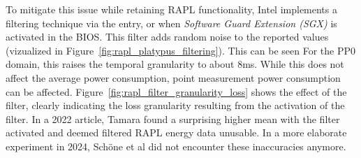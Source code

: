 \begin{itemize}
    To mitigate this issue while retaining RAPL functionality, Intel implements a filtering technique via the \parencite[Table 2-2]{intel2023} entry, or when \textit{Software Guard Extension (SGX)} is activated in the BIOS. This filter adds random noise to the reported values (vizualized in Figure~\ref{fig:rapl_platypus_filtering}). This can be seen For the PP0 domain, this raises the temporal granularity to about 8ms. While this does not affect the average power consumption, point measurement power consumption can be affected. Figure~\ref{fig:rapl_filter_granularity_loss} shows the effect of the filter, clearly indicating the loss granularity resulting from the activation of the filter. In a 2022 article, Tamara\parencite{greencoding_rapl_sgx} found a surprising higher mean with the filter activated and deemed filtered RAPL energy data unusable. In a more elaborate experiment in 2024, Schöne et al did not encounter these inaccuracies anymore.


\end{itemize}

